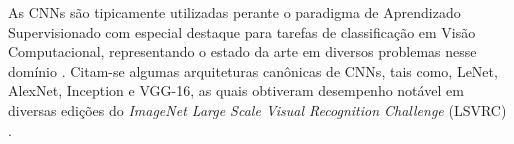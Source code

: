 As CNNs são tipicamente utilizadas perante o paradigma de Aprendizado Supervisionado com especial destaque para tarefas de classificação em Visão Computacional, representando o estado da arte em diversos problemas nesse domínio \cite{Khan:2018}. Citam-se algumas arquiteturas canônicas de CNNs, tais como, LeNet, AlexNet, Inception e VGG-16, as quais obtiveram desempenho notável em diversas edições do \emph{ImageNet Large Scale Visual Recognition Challenge} (LSVRC) \cite{ILSVRC15}.
